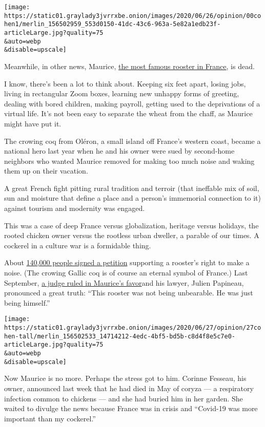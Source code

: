 \texttt{[image: https://static01.graylady3jvrrxbe.onion/images/2020/06/26/opinion/00cohen1/merlin\_156502959\_553d0150-41dc-43c6-963a-5e82a1edb23f-articleLarge.jpg?quality=75\\\&auto=webp\\\&disable=upscale]}

Meanwhile, in other news, Maurice,
\href{https://www.nytimes3xbfgragh.onion/2019/06/23/world/europe/france-rural-urban-rooster.html}{the
most famous rooster in France}, is dead.

I know, there's been a lot to think about. Keeping six feet apart,
losing jobs, living in rectangular Zoom boxes, learning new unhappy
forms of greeting, dealing with bored children, making payroll, getting
used to the deprivations of a virtual life. It's not been easy to
separate the wheat from the chaff, as Maurice might have put it.

The crowing coq from Oléron, a small island off France's western coast,
became a national hero last year when he and his owner were sued by
second-home neighbors who wanted Maurice removed for making too much
noise and waking them up on their vacation.

A great French fight pitting rural tradition and terroir (that ineffable
mix of soil, sun and moisture that define a place and a person's
immemorial connection to it) against tourism and modernity was engaged.

This was a case of deep France versus globalization, heritage versus
holidays, the rooted chicken owner versus the rootless urban dweller, a
parable of our times. A cockerel in a culture war is a formidable thing.

About
\href{https://www.thelocal.fr/20190905/maurice-the-cockerel-to-learn-his-fate-in-row-over-noise-in-rural-france}{140,000
people signed a petition} supporting a rooster's right to make a noise.
(The crowing Gallic coq is of course an eternal symbol of France.) Last
September,
\href{https://www.nytimes3xbfgragh.onion/2019/09/05/world/europe/france-maurice-rooster.html}{a
judge ruled in Maurice's favor}and his lawyer, Julien Papineau,
pronounced a great truth: ``This rooster was not being unbearable. He
was just being himself.''

\texttt{[image: https://static01.graylady3jvrrxbe.onion/images/2020/06/27/opinion/27cohen-tall/merlin\_156502533\_14714212-4edc-4bf5-bd5b-c8d4f8e5c7e0-articleLarge.jpg?quality=75\\\&auto=webp\\\&disable=upscale]}

Now Maurice is no more. Perhaps the stress got to him. Corinne Fesseau,
his owner, announced last week that he had died in May of coryza --- a
respiratory infection common to chickens --- and she had buried him in
her garden. She waited to divulge the news because France was in crisis
and ``Covid-19 was more important than my cockerel.''

